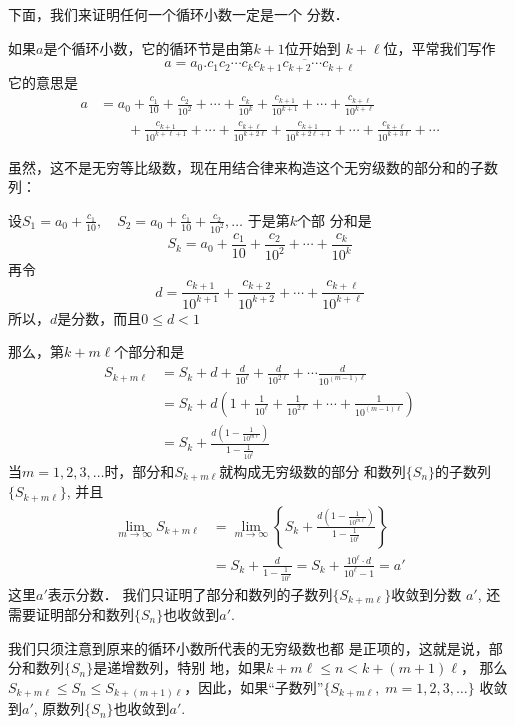 下面，我们来证明任何一个循环小数一定是一个
分数．

如果$a$是个循环小数，它的循环节是由第$k+1$位开始到
$k+\ell$位，平常我们写作
\[a=a_0.c_1c_2\cdots c_k\overline{c_{k+1}c_{k+2}\cdots c_{k+\ell}}\]
它的意思是
\[\begin{split}
    a&=a_0+\frac{c_1}{10}+\frac{c_2}{10^2}+\cdots +\frac{c_k}{10^k}+\frac{c_{k+1}}{10^{k+1}}+\cdots+\frac{c_{k+\ell}}{10^{k+\ell}}\\
&\qquad +\frac{c_{k+1}}{10^{k+\ell+1}}+\cdots+\frac{c_{k+\ell}}{10^{k+2\ell}}+\frac{c_{k+1}}{10^{k+2\ell+1}}+\cdots+\frac{c_{k+\ell}}{10^{k+3\ell}}+\cdots
\end{split}\]

虽然，这不是无穷等比级数，现在用结合律来构造这个无穷级数的部分和的子数列：

设$S_1=a_0+\frac{c_1}{10},\quad S_2=a_0+\frac{c_1}{10}+\frac{c_2}{10^2},\ldots$ 于是第$k$个部
分和是
\[S_k=a_0+\frac{c_1}{10}+\frac{c_2}{10^2}+\cdots+\frac{c_k}{10^k}\]
再令
\[d=\frac{c_{k+1}}{10^{k+1}}+\frac{c_{k+2}}{10^{k+2}}+\cdots +\frac{c_{k+\ell}}{10^{k+\ell}}\]
所以，$d$是分数，而且$0\le d<1$

那么，第$k+m\ell$个部分和是
\[\begin{split}
    S_{k+m\ell}&=S_k+d+\frac{d}{10^{\ell}}+\frac{d}{10^{2\ell}}+\cdots \frac{d}{10^{(m-1)\ell}}\\
    &=S_k+d\left(1+\frac{1}{10^{\ell}}+\frac{1}{10^{2\ell}}+\cdots +\frac{1}{10^{(m-1)\ell}}\right)\\
    &=S_k+\frac{d\left(1-\frac{1}{10^{m\ell}}\right)}{1-\frac{1}{10^{\ell}}}
\end{split}\]
当$m=1,2,3,\ldots$时，部分和$S_{k+m\ell}$就构成无穷级数的部分
和数列$\{S_n\}$的子数列$\{S_{k+m\ell}\}$, 并且
\[\begin{split}
    \lim_{m\to\infty}S_{k+m\ell}&= \lim_{m\to\infty}\left\{S_k+\frac{d\left(1-\frac{1}{10^{m\ell}}\right)}{1-\frac{1}{10^{\ell}}}\right\}\\
    &=S_k+\frac{d}{1-\frac{1}{10^{\ell}}}=S_k+\frac{10^{\ell}\cdot d}{10^{\ell}-1}=a'
\end{split}\]
这里$a'$表示分数．
我们只证明了部分和数列的子数列$\{S_{k+m\ell}\}$收敛到分数
$a'$, 还需要证明部分和数列$\{S_n\}$也收敛到$a'$.

我们只须注意到原来的循环小数所代表的无穷级数也都
是正项的，这就是说，部分和数列$\{S_n\}$是递增数列，特别
地，如果$k+m\ell\le n<k+(m+1)\ell$，
那么$S_{k+m\ell}\le S_n\le S_{k+(m+1)\ell}$，因此，如果“子数列”$\{S_{k+m\ell},\; m=1,2,3,\ldots\}$
收敛到$a'$, 原数列$\{S_n\}$也收敛到$a'$.


